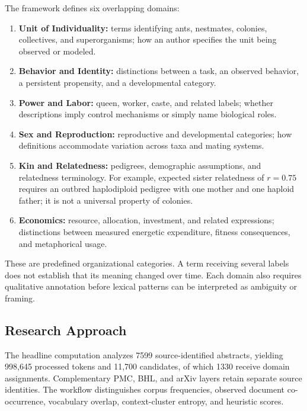 \documentclass[
]{article}
\providecommand{\tightlist}{%
  \setlength{\itemsep}{0pt}\setlength{\parskip}{0pt}}
\numberwithin{equation}{section}
\begin{document}
The framework defines six overlapping domains:

\begin{enumerate}
\def\labelenumi{\arabic{enumi}.}
\tightlist
\item
  \textbf{Unit of Individuality:} terms identifying ants, nestmates,
  colonies, collectives, and superorganisms; how an author specifies the
  unit being observed or modeled.
\item
  \textbf{Behavior and Identity:} distinctions between a task, an
  observed behavior, a persistent propensity, and a developmental
  category.
\item
  \textbf{Power and Labor:} queen, worker, caste, and related labels;
  whether descriptions imply control mechanisms or simply name
  biological roles.
\item
  \textbf{Sex and Reproduction:} reproductive and developmental
  categories; how definitions accommodate variation across taxa and
  mating systems.
\item
  \textbf{Kin and Relatedness:} pedigrees, demographic assumptions, and
  relatedness terminology. For example, expected sister relatedness of
  \(r=0.75\) requires an outbred haplodiploid pedigree with one mother
  and one haploid father; it is not a universal property of colonies.
\item
  \textbf{Economics:} resource, allocation, investment, and related
  expressions; distinctions between measured energetic expenditure,
  fitness consequences, and metaphorical usage.
\end{enumerate}

These are predefined organizational categories. A term receiving several
labels does not establish that its meaning changed over time. Each
domain also requires qualitative annotation before lexical patterns can
be interpreted as ambiguity or framing.

\subsection{Research Approach}\label{research-approach}

The headline computation analyzes 7599 source-identified abstracts,
yielding 998,645 processed tokens and 11,700 candidates, of which 1330
receive domain assignments. Complementary PMC, BHL, and arXiv layers
retain separate source identities. The workflow distinguishes corpus
frequencies, observed document co-occurrence, vocabulary overlap,
context-cluster entropy, and heuristic scores.
\end{document}
